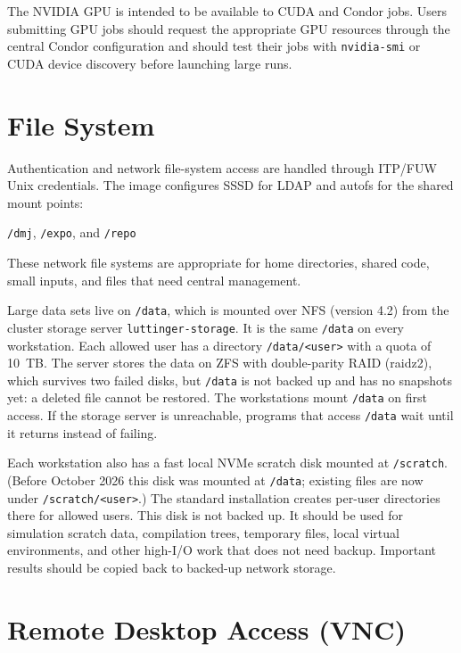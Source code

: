\documentclass[11pt]{article}
\begin{document}
The NVIDIA GPU is intended to be available to CUDA and Condor jobs.  Users
submitting GPU jobs should request the appropriate GPU resources through the
central Condor configuration and should test their jobs with \texttt{nvidia-smi}
or CUDA device discovery before launching large runs.

\section{File System}

Authentication and network file-system access are handled through ITP/FUW Unix
credentials.  The image configures SSSD for LDAP and autofs for the shared
mount points:

\begin{center}
\texttt{/dmj}, \texttt{/expo}, and \texttt{/repo}
\end{center}

These network file systems are appropriate for home directories, shared code,
small inputs, and files that need central management.

Large data sets live on \texttt{/data}, which is mounted over NFS (version
4.2) from the cluster storage server \texttt{luttinger-storage}.  It is the
same \texttt{/data} on every workstation.  Each allowed user has a directory
\texttt{/data/<user>} with a quota of 10~TB.  The server stores the data on
ZFS with double-parity RAID (raidz2), which survives two failed disks, but
\texttt{/data} is not backed up and has no snapshots yet: a deleted file
cannot be restored.  The workstations mount \texttt{/data} on first access.
If the storage server is unreachable, programs that access \texttt{/data} wait
until it returns instead of failing.

Each workstation also has a fast local NVMe scratch disk mounted at
\texttt{/scratch}.  (Before October 2026 this disk was mounted at
\texttt{/data}; existing files are now under \texttt{/scratch/<user>}.)  The
standard installation creates per-user directories there for allowed users.
This disk is not backed up.  It should be used for
simulation scratch data, compilation trees, temporary files, local virtual
environments, and other high-I/O work that does not need backup.  Important
results should be copied back to backed-up network storage.

\section{Remote Desktop Access (VNC)}
\end{document}
